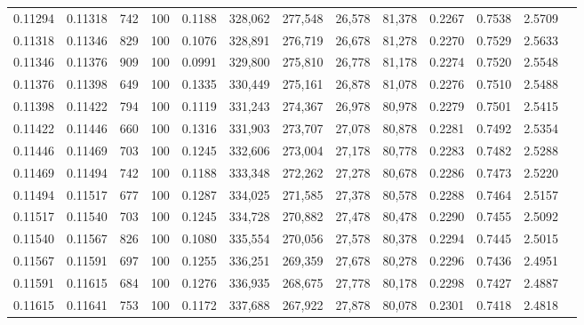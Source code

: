 \begin{tabular}{rrrrrrrrrrrrr}
0.11294 & 0.11318 &   742 & 100 &                                     0.1188 & 328,062 & 277,548 &  26,578 &  81,378 & 0.2267 & 0.7538 & 2.5709 \\
0.11318 & 0.11346 &   829 & 100 &                                     0.1076 & 328,891 & 276,719 &  26,678 &  81,278 & 0.2270 & 0.7529 & 2.5633 \\
0.11346 & 0.11376 &   909 & 100 &                                     0.0991 & 329,800 & 275,810 &  26,778 &  81,178 & 0.2274 & 0.7520 & 2.5548 \\
0.11376 & 0.11398 &   649 & 100 &                                     0.1335 & 330,449 & 275,161 &  26,878 &  81,078 & 0.2276 & 0.7510 & 2.5488 \\
0.11398 & 0.11422 &   794 & 100 &                                     0.1119 & 331,243 & 274,367 &  26,978 &  80,978 & 0.2279 & 0.7501 & 2.5415 \\
0.11422 & 0.11446 &   660 & 100 &                                     0.1316 & 331,903 & 273,707 &  27,078 &  80,878 & 0.2281 & 0.7492 & 2.5354 \\
0.11446 & 0.11469 &   703 & 100 &                                     0.1245 & 332,606 & 273,004 &  27,178 &  80,778 & 0.2283 & 0.7482 & 2.5288 \\
0.11469 & 0.11494 &   742 & 100 &                                     0.1188 & 333,348 & 272,262 &  27,278 &  80,678 & 0.2286 & 0.7473 & 2.5220 \\
0.11494 & 0.11517 &   677 & 100 &                                     0.1287 & 334,025 & 271,585 &  27,378 &  80,578 & 0.2288 & 0.7464 & 2.5157 \\
0.11517 & 0.11540 &   703 & 100 &                                     0.1245 & 334,728 & 270,882 &  27,478 &  80,478 & 0.2290 & 0.7455 & 2.5092 \\
0.11540 & 0.11567 &   826 & 100 &                                     0.1080 & 335,554 & 270,056 &  27,578 &  80,378 & 0.2294 & 0.7445 & 2.5015 \\
0.11567 & 0.11591 &   697 & 100 &                                     0.1255 & 336,251 & 269,359 &  27,678 &  80,278 & 0.2296 & 0.7436 & 2.4951 \\
0.11591 & 0.11615 &   684 & 100 &                                     0.1276 & 336,935 & 268,675 &  27,778 &  80,178 & 0.2298 & 0.7427 & 2.4887 \\
0.11615 & 0.11641 &   753 & 100 &                                     0.1172 & 337,688 & 267,922 &  27,878 &  80,078 & 0.2301 & 0.7418 & 2.4818 \\

\end{tabular}
